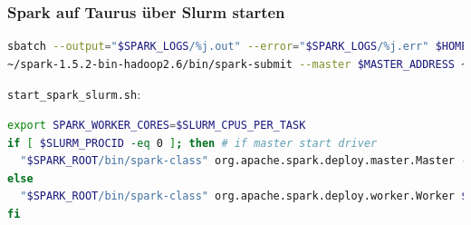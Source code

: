 \begin{frame}[fragile]
    \frametitle{Spark auf Taurus über Slurm starten}
\begin{lstlisting}[language=bash]
sbatch --output="$SPARK_LOGS/%j.out" --error="$SPARK_LOGS/%j.err" $HOME/scaromare/start_spark_slurm.sh --time=04:00:00 --nodes=$((nodes+1)) --partition=gpu2 --gres=gpu:$gpusPerNode --cpus-per-task=$coresPerNode
~/spark-1.5.2-bin-hadoop2.6/bin/spark-submit --master $MASTER_ADDRESS ~/scaromare/MontePi/multiNode/multiGpu/scala/MontePi.jar ...
\end{lstlisting}\vspace{-1.5\baselineskip}
    \lstinline!start_spark_slurm.sh!:
    \begin{lstlisting}[language=bash,xleftmargin=0pt,linewidth=1.05\linewidth,basicstyle=\scriptsize]
export SPARK_WORKER_CORES=$SLURM_CPUS_PER_TASK
if [ $SLURM_PROCID -eq 0 ]; then # if master start driver
  "$SPARK_ROOT/bin/spark-class" org.apache.spark.deploy.master.Master --ip $(hostname) --port $SPARK_MASTER_PORT --webui-port $SPARK_MASTER_WEBUI_PORT
else
  "$SPARK_ROOT/bin/spark-class" org.apache.spark.deploy.worker.Worker $MASTER_NODE
fi
\end{lstlisting}
\end{frame}

